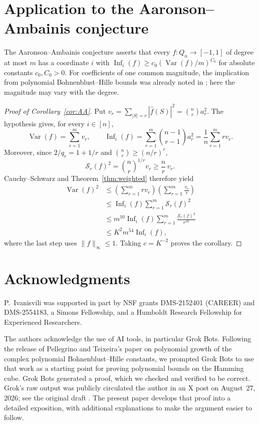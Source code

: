 \documentclass[11pt]{amsart}
\theoremstyle{remark}
\numberwithin{equation}{section}
\begin{document}
\section{Application to the Aaronson--Ambainis conjecture}\label{sec:AA}

The Aaronson--Ambainis conjecture \cite[Conjecture~1.7]{AA14} asserts that
every $f:Q_n\to[-1,1]$ of degree at most $m$ has a coordinate $i$ with
$\operatorname{Inf}_i(f)\ge c_0(\operatorname{Var}(f)/m)^{C_0}$ for absolute
constants $c_0,C_0>0$. For coefficients of one common magnitude, the
implication from polynomial Bohnenblust--Hille bounds was already noted
in \cite{DMP19}; here the magnitude may vary with the degree.

\begin{proof}[Proof of Corollary~\ref{cor:AA}]
Put $v_r=\sum_{|S|=r}|\widehat f(S)|^2=\binom nr a_r^2$. The hypothesis
gives, for every $i\in[n]$,
\[
\operatorname{Var}(f)=\sum_{r=1}^m v_r,
\qquad
\operatorname{Inf}_i(f)=\sum_{r=1}^m\binom{n-1}{r-1}a_r^2
=\frac1n\sum_{r=1}^m rv_r.
\]
Moreover, since $2/q_r=1+1/r$ and $\binom nr\ge(n/r)^r$,
\[
\mathcal{S}_r(f)^2=\binom nr^{1/r}v_r\ge\frac nr\,v_r.
\]
Cauchy--Schwarz and Theorem~\ref{thm:weighted} therefore yield
\begin{align*}
\operatorname{Var}(f)^2
&\le\left(\sum_{r=1}^m rv_r\right)
       \left(\sum_{r=1}^m\frac{v_r}{r}\right)\\
&\le\operatorname{Inf}_i(f)\sum_{r=1}^m\mathcal{S}_r(f)^2\\
&\le m^{10}\operatorname{Inf}_i(f)
       \sum_{r=1}^m\frac{\mathcal{S}_r(f)^2}{r^{10}}\\
&\le K^2m^{54}\operatorname{Inf}_i(f),
\end{align*}
where the last step uses $\|f\|_\infty\le1$.
Taking $c=K^{-2}$ proves the corollary.
\end{proof}

\section*{Acknowledgments}
P.~Ivanisvili was supported in part by NSF grants DMS-2152401 (CAREER)
and DMS-2554183, a Simons Fellowship, and a Humboldt Research Fellowship
for Experienced Researchers.

The authors acknowledge the use of AI tools, in particular Grok Bots.
Following the release of Pellegrino and Teixeira's paper \cite{PT26} on
polynomial growth of the complex polynomial Bohnenblust--Hille constants,
we prompted Grok Bots to use that work as a starting point for proving
polynomial bounds on the Hamming cube. Grok Bots generated a proof,
which we checked and verified to be correct. Grok's raw output was
publicly circulated the author in an X post on August~27, 2026;
see the original draft \cite{Grok26}. The present paper develops
that proof into a detailed exposition, with additional explanations to make the argument easier to follow.
\end{document}
